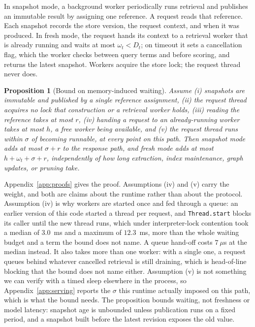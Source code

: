 \documentclass{article} %
\newtheorem{proposition}{Proposition}
\begin{document}
In snapshot mode, a background worker periodically runs retrieval and publishes an immutable result by assigning one reference. A request reads that reference. Each snapshot records the store version, the request context, and when it was produced. In fresh mode, the request hands its context to a retrieval worker that is already running and waits at most $\omega_t<D_t$; on timeout it sets a cancellation flag, which the worker checks between query terms and before scoring, and returns the latest snapshot. Workers acquire the store lock; the request thread never does.

\begin{proposition}[Bound on memory-induced waiting]
\label{prop:waiting}
Assume (i) snapshots are immutable and published by a single reference assignment, (ii) the request thread acquires no lock that construction or a retrieval worker holds, (iii) reading the reference takes at most $r$, (iv) handing a request to an already-running worker takes at most $h$, a free worker being available, and (v) the request thread runs within $\sigma$ of becoming runnable, at every point on this path. Then snapshot mode adds at most $\sigma+r$ to the response path, and fresh mode adds at most $h+\omega_t+\sigma+r$, independently of how long extraction, index maintenance, graph updates, or pruning take.
\end{proposition}

Appendix~\ref{app:proofs} gives the proof. Assumptions (iv) and (v) carry the weight, and both are claims about the runtime rather than about the protocol. Assumption (iv) is why workers are started once and fed through a queue: an earlier version of this code started a thread per request, and \texttt{Thread.start} blocks its caller until the new thread runs, which under interpreter-lock contention took a median of $3.0$~ms and a maximum of $12.3$~ms, more than the whole waiting budget and a term the bound does not name. A queue hand-off costs $7~\mu$s at the median instead. It also takes more than one worker: with a single one, a request queues behind whatever cancelled retrieval is still draining, which is head-of-line blocking that the bound does not name either. Assumption (v) is not something we can verify with a timed sleep elsewhere in the process, so Appendix~\ref{app:serving} reports the $\sigma$ this runtime actually imposed on this path, which is what the bound needs. The proposition bounds waiting, not freshness or model latency: snapshot age is unbounded unless publication runs on a fixed period, and a snapshot built before the latest revision exposes the old value.
\end{document}
